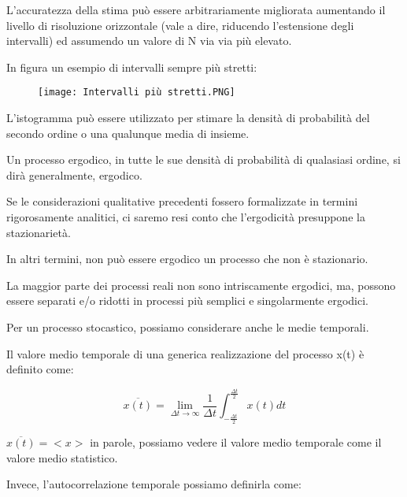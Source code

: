 L'accuratezza della stima può essere arbitrariamente migliorata aumentando il livello di risoluzione orizzontale (vale a dire, riducendo l'estensione degli intervalli) 
ed assumendo un valore di N via via più elevato. \newline 

In figura un esempio di intervalli sempre più stretti: 

\begin{figure}[h]
    \centering
    \texttt{[image: Intervalli più stretti.PNG]}
\end{figure}  


L'istogramma può essere utilizzato per stimare la densità di probabilità del secondo ordine o una qualunque media di insieme. \newline 

Un processo ergodico, in tutte le sue densità di probabilità di qualasiasi ordine, si dirà 
generalmente, ergodico. \newline 

Se le considerazioni qualitative precedenti fossero formalizzate in termini rigorosamente analitici, 
ci saremo resi conto che l'ergodicità presuppone la stazionarietà. \newline 

In altri termini, non può essere ergodico un processo che non è stazionario. \newline 

La maggior parte dei processi reali non sono intriscamente ergodici, ma, possono essere separati e/o ridotti in processi 
più semplici e singolarmente ergodici.\newline 


Per un processo stocastico, possiamo considerare anche le medie temporali. \newline 

Il valore medio temporale di una generica realizzazione del processo x(t) è definito come: 

{
    \Large 
    \begin{equation}
        \overline{x(t)} 
        =
        \lim_{\Delta t \to \infty}
        \frac{1}{\Delta t}
        \int_{-\frac{\Delta t}{2}}^{\frac{\Delta t}{2}} 
        x(t) dt  
    \end{equation}
}

$\overline{x(t)} = <x> $ in parole, possiamo vedere il valore medio temporale come il valore medio statistico. \newline 

Invece, l'autocorrelazione temporale possiamo definirla come: 

